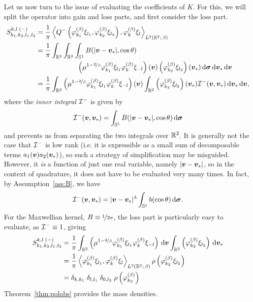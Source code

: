 Let us now turn to the issue of evaluating the coefficients of $K$. For this, we will split the operator into
gain and loss parts, and first consider the loss part.
\begin{align*}
    S_{k_1,k_2,l_1,l_2}^{k,l\;(-)} 
    &= \frac{1}{\pi} \left\langle Q^-\left(\varphi^{(\beta)}_{k_1} \xi_{l_1},
    \varphi^{(\beta)}_{k_2} \xi_{l_2}\right), \varphi^{(\beta)}_k \xi_l \right\rangle_{L^2(\mathbb{R}^2;\,\beta)} \\
    &= \frac{1}{\pi} \int_{\mathbb{R}^2}\int_{\mathbb{R}^2}\int_{\mathbb{S}^1}B(|{\bm v}-{\bm v}_\ast|,\cos\theta) \\
    & \qquad\qquad\qquad
    \left(\mu^{1-\nicefrac{2}{\beta}}\varphi^{(\beta)}_{k_1}\xi_{l_1} \varphi^{(\beta)}_{k}\xi_{-l}\right)({\bm v})
    \left(\varphi^{(\beta)}_{k_2}\xi_{l_2}\right)({\bm v}_\ast)
    \,\mathrm{d}{\bm\sigma}\,\mathrm{d}{\bm v}_\ast\,\mathrm{d}{\bm v} \\
    &= \frac{1}{\pi}
    \int_{\mathbb{R}^2} \left(\mu^{1-\nicefrac{2}{\beta}} 
            \varphi^{(\beta)}_{k_1}\xi_{l_1} \varphi^{(\beta)}_{k}\xi_{-l}\right)({\bm v})
    \int_{\mathbb{R}^2} \left(\varphi^{(\beta)}_{k_2}\xi_{l_2}\right)({\bm v}_\ast) \mathcal{I}^-({\bm v},{\bm v}_\ast) \,\mathrm{d}{\bm v}_\ast \,\mathrm{d}{\bm v},
\end{align*}
where the {\em inner integral} $\mathcal{I}^-$ is given by
\[
    \mathcal{I}^-({\bm v},{\bm v}_\ast) = \int_{\mathbb{S}^1} B(|{\bm v}-{\bm v}_\ast|, \cos\theta) \,\mathrm{d}{\bm\sigma}
\]
and prevents us from separating the two integrals over $\mathbb{R}^2$. It is generally not the case that $\mathcal{I}^-$ is
low rank (i.e. it is expressible as a small sum of decomposable terms $a_1({\bm v})a_2({\bm v}_\ast)$), so such a
strategy of simplification may be misguided. However, it {\em is} a function of just one real variable, namely
$|{\bm v}-{\bm v}_\ast|$, so in the context of quadrature, it does not have to be evaluated very many times. In
fact, by Assumption~\ref{ass:B}, we have
\[
    \mathcal{I}^-({\bm v},{\bm v}_\ast) = |{\bm v}-{\bm v}_\ast|^\lambda \int_{\mathbb{S}^1} b(\cos\theta) \,\mathrm{d}{\bm\sigma}.
\]
For the Maxwellian kernel, $B\equiv\nicefrac{1}{2\pi}$, the loss part is particularly easy to evaluate, as
$\mathcal{I}^-\equiv1$, giving
\begin{align*}
    S_{k_1,k_2,l_1,l_2}^{k,l\;(-)} 
    &= \frac{1}{\pi} \int_{\mathbb{R}^2} \left( \mu^{1-\nicefrac{2}{\beta}}
       \varphi^{(\beta)}_{k_1}\xi_{l_1} \varphi^{(\beta)}_{k}\xi_{-l}\right)\,\mathrm{d}{\bm v}
       \int_{\mathbb{R}^2} \left(\varphi^{(\beta)}_{k_2}\xi_{l_2}\right)\,\mathrm{d}{\bm v}_\ast \\
    &= \frac{1}{\pi} \left\langle\varphi^{(\beta)}_{k_1}\xi_{l_1}, 
                                 \varphi^{(\beta)}_{k}\xi_{l}\right\rangle_{L^2(\mathbb{R}^2;\,\beta)} 
       \rho\left(\varphi^{(\beta)}_{k_2}\xi_{l_2}\right) \\
       &= \delta_{k,k_1}\;\delta_{l,l_1}\;\delta_{0,l_2}\;\rho\left(\varphi^{(\beta)}_{k_2}\right)
\end{align*}
Theorem~\ref{thm:polobs} provides the mass densities.

